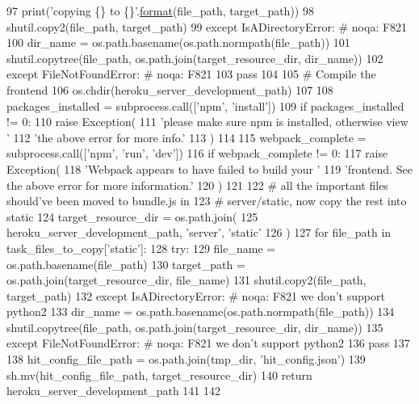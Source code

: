 \begin{DoxyCode}
97                 print(\textcolor{stringliteral}{'copying \{\} to \{\}'}.\hyperlink{namespaceparlai_1_1chat__service_1_1services_1_1messenger_1_1shared__utils_a32e2e2022b824fbaf80c747160b52a76}{format}(file\_path, target\_path))
98                 shutil.copy2(file\_path, target\_path)
99             \textcolor{keywordflow}{except} IsADirectoryError:  \textcolor{comment}{# noqa: F821}
100                 dir\_name = os.path.basename(os.path.normpath(file\_path))
101                 shutil.copytree(file\_path, os.path.join(target\_resource\_dir, dir\_name))
102             \textcolor{keywordflow}{except} FileNotFoundError:  \textcolor{comment}{# noqa: F821}
103                 \textcolor{keywordflow}{pass}
104 
105     \textcolor{comment}{# Compile the frontend}
106     os.chdir(heroku\_server\_development\_path)
107 
108     packages\_installed = subprocess.call([\textcolor{stringliteral}{'npm'}, \textcolor{stringliteral}{'install'}])
109     \textcolor{keywordflow}{if} packages\_installed != 0:
110         \textcolor{keywordflow}{raise} Exception(
111             \textcolor{stringliteral}{'please make sure npm is installed, otherwise view '}
112             \textcolor{stringliteral}{'the above error for more info.'}
113         )
114 
115     webpack\_complete = subprocess.call([\textcolor{stringliteral}{'npm'}, \textcolor{stringliteral}{'run'}, \textcolor{stringliteral}{'dev'}])
116     \textcolor{keywordflow}{if} webpack\_complete != 0:
117         \textcolor{keywordflow}{raise} Exception(
118             \textcolor{stringliteral}{'Webpack appears to have failed to build your '}
119             \textcolor{stringliteral}{'frontend. See the above error for more information.'}
120         )
121 
122     \textcolor{comment}{# all the important files should've been moved to bundle.js in}
123     \textcolor{comment}{# server/static, now copy the rest into static}
124     target\_resource\_dir = os.path.join(
125         heroku\_server\_development\_path, \textcolor{stringliteral}{'server'}, \textcolor{stringliteral}{'static'}
126     )
127     \textcolor{keywordflow}{for} file\_path \textcolor{keywordflow}{in} task\_files\_to\_copy[\textcolor{stringliteral}{'static'}]:
128         \textcolor{keywordflow}{try}:
129             file\_name = os.path.basename(file\_path)
130             target\_path = os.path.join(target\_resource\_dir, file\_name)
131             shutil.copy2(file\_path, target\_path)
132         \textcolor{keywordflow}{except} IsADirectoryError:  \textcolor{comment}{# noqa: F821 we don't support python2}
133             dir\_name = os.path.basename(os.path.normpath(file\_path))
134             shutil.copytree(file\_path, os.path.join(target\_resource\_dir, dir\_name))
135         \textcolor{keywordflow}{except} FileNotFoundError:  \textcolor{comment}{# noqa: F821 we don't support python2}
136             \textcolor{keywordflow}{pass}
137 
138     hit\_config\_file\_path = os.path.join(tmp\_dir, \textcolor{stringliteral}{'hit\_config.json'})
139     sh.mv(hit\_config\_file\_path, target\_resource\_dir)
140     \textcolor{keywordflow}{return} heroku\_server\_development\_path
141 
142 
\end{DoxyCode}
